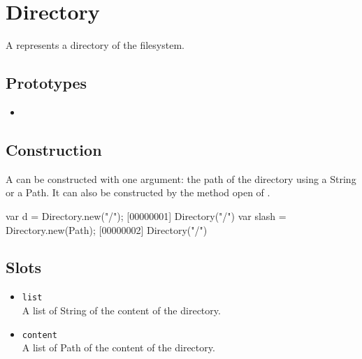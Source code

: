 \section{Directory}

A  represents a directory of the filesystem.

\subsection{Prototypes}
\begin{itemize}
\item {}
\end{itemize}

\subsection{Construction}

A  can be constructed with one argument: the path of
the directory using a String or a Path. It can also be constructed by
the method open of .

\begin{urbiscript}
var d = Directory.new("/");
[00000001] Directory("/")
var slash = Directory.new(Path);
[00000002] Directory("/")
\end{urbiscript}

\subsection{Slots}
\begin{itemize}
\item \lstinline|list|\\
  A list of String of the content of the directory.

\item \lstinline|content|\\
  A list of Path of the content of the directory.

\end{itemize}
